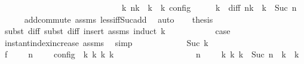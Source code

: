 \begin{isabellebody}
\ \ \ \ \ \ \ \ \ \ \ \ \ \ \ \ \ \ \ \ \ \ \ \ \ {\isasymand}\ {\isasymrho}\ {\isasymin}\ {\isasymlbrakk}\ {\isasymGamma}\isactrlsub k{\isacharcomma}\ n\isactrlsub k\ {\isasymturnstile}\ {\isasymPsi}\isactrlsub k\ {\isasymtriangleright}\ {\isasymPhi}\isactrlsub k\ {\isasymrbrakk}\isactrlsub c\isactrlsub o\isactrlsub n\isactrlsub f\isactrlsub i\isactrlsub g{\isacartoucheclose}\isanewline
%
\isadelimproof
%
\endisadelimproof
%
\isatagproof
{}\isamarkupfalse%
\ {\isacharminus}\isanewline
\ \ \isamarkupfalse%
\ {\isasymdelta}k\ \ diff{\isacharcolon}\ {\isacartoucheopen}n\isactrlsub k\ {\isacharequal}\ {\isasymdelta}k\ {\isacharplus}\ Suc\ n{\isacartoucheclose}\isanewline
\ \ \ \ \isamarkupfalse%
\ add{\isachardot}commute\ assms{\isacharparenleft}{}{\isacharparenright}\ less{\isacharunderscore}iff{\isacharunderscore}Suc{\isacharunderscore}add\ \isamarkupfalse%
\ auto\isanewline
\ \ \isamarkupfalse%
\ {\isacharquery}thesis\isanewline
\ \ \ \ \isamarkupfalse%
\ {\isacharparenleft}subst\ diff{\isacharcomma}\ subst\ diff{\isacharcomma}\ insert\ assms{\isacharparenleft}{}{\isacharparenright}{\isacharcomma}\ induct\ {\isasymdelta}k{\isacharparenright}\isanewline
\ \ \ \ \ \ \isamarkupfalse%
\ {}\ \ \isamarkupfalse%
\ {\isacharquery}case\isanewline
\ \ \ \ \ \ \ \ \isamarkupfalse%
\ instant{\isacharunderscore}index{\isacharunderscore}increase\ assms{\isacharparenleft}{}{\isacharparenright}\ \isamarkupfalse%
\ simp\isanewline
\ \ \ \ \isamarkupfalse%
\isanewline
\ \ \ \ \ \ \isamarkupfalse%
\ {\isacharparenleft}Suc\ {\isasymdelta}k{\isacharparenright}\isanewline
\ \ \ \ \ \ \ \ \isamarkupfalse%
\ f{}{\isacharcolon}\ {\isacartoucheopen}{\isasymrho}\ {\isasymin}\ {\isasymlbrakk}\ {\isasymGamma}{\isacharcomma}\ n\ {\isasymturnstile}\ {\isasymPsi}\ {\isasymtriangleright}\ {\isasymPhi}\ {\isasymrbrakk}\isactrlsub c\isactrlsub o\isactrlsub n\isactrlsub f\isactrlsub i\isactrlsub g\ {\isasymLongrightarrow}\ {\isasymexists}{\isasymGamma}\isactrlsub k\ {\isasymPsi}\isactrlsub k\ {\isasymPhi}\isactrlsub k\ k{\isachardot}\isanewline
\ \ \ \ \ \ \ \ \ \ \ \ \ \ \ \ \ \ {\isacharparenleft}{\isacharparenleft}{\isasymGamma}{\isacharcomma}\ n\ {\isasymturnstile}\ {\isasymPsi}\ {\isasymtriangleright}\ {\isasymPhi}{\isacharparenright}\ {\isasymhookrightarrow}\isactrlbsup k\isactrlesup \ {\isacharparenleft}{\isasymGamma}\isactrlsub k{\isacharcomma}\ {\isasymdelta}k\ {\isacharplus}\ Suc\ n\ {\isasymturnstile}\ {\isasymPsi}\isactrlsub k\ {\isasymtriangleright}\ {\isasymPhi}\isactrlsub k{\isacharparenright}{\isacharparenright}\isanewline

\end{isabellebody}
